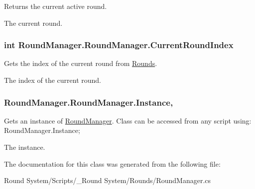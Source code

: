 Returns the current active round. 

The current round.\hypertarget{class_round_manager_1_1_round_manager_a23c76c88e03e7150362ab75ec995df50}{}
\subsubsection[{Current\+Round\+Index}]{\setlength{\rightskip}{0pt plus 5cm}int Round\+Manager.\+Round\+Manager.\+Current\+Round\+Index\hspace{0.3cm}{\ttfamily [get]}}\label{class_round_manager_1_1_round_manager_a23c76c88e03e7150362ab75ec995df50}


Gets the index of the current round from \hyperlink{class_round_manager_1_1_round_manager_aca52a7d7a2dc064d0db460fc1292a297}{Rounds}. 

The index of the current round.\hypertarget{class_round_manager_1_1_round_manager_a342eec1453f6fbc73e9eac8cdc722cb3}{}
\subsubsection[{Instance}]{ Round\+Manager.\+Round\+Manager.\+Instance\hspace{0.3cm}{\ttfamily [static]}, {\ttfamily [get]}}\label{class_round_manager_1_1_round_manager_a342eec1453f6fbc73e9eac8cdc722cb3}


Gets an instance of \hyperlink{class_round_manager_1_1_round_manager}{Round\+Manager}. Class can be accessed from any script using\+: Round\+Manager.\+Instance; 

The instance.

The documentation for this class was generated from the following file\+:\begin{DoxyCompactItemize}
\item 
Round System/\+Scripts/\+\_\+\+Round System/\+Rounds/Round\+Manager.\+cs\end{DoxyCompactItemize}
